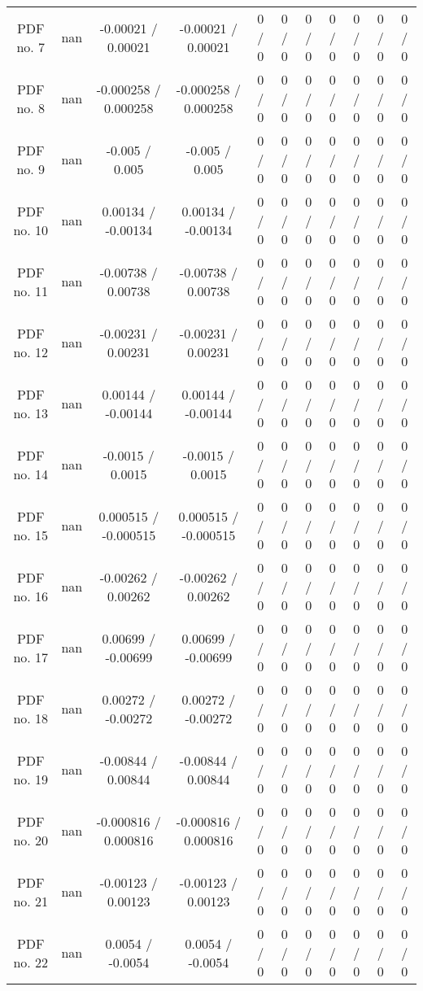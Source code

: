 \begin{table}[htbp]
\begin{center}
\begin{tabular}{|c|c|c|c|c|c|c|c|c|c|c|}
  PDF no. 7 &    nan    & -0.00021 / 0.00021 & -0.00021 / 0.00021 & 0 / 0 & 0 / 0 & 0 / 0 & 0 / 0 & 0 / 0 & 0 / 0 & 0 / 0 \\ 
  PDF no. 8 &    nan    & -0.000258 / 0.000258 & -0.000258 / 0.000258 & 0 / 0 & 0 / 0 & 0 / 0 & 0 / 0 & 0 / 0 & 0 / 0 & 0 / 0 \\ 
  PDF no. 9 &    nan    & -0.005 / 0.005 & -0.005 / 0.005 & 0 / 0 & 0 / 0 & 0 / 0 & 0 / 0 & 0 / 0 & 0 / 0 & 0 / 0 \\ 
  PDF no. 10 &    nan    & 0.00134 / -0.00134 & 0.00134 / -0.00134 & 0 / 0 & 0 / 0 & 0 / 0 & 0 / 0 & 0 / 0 & 0 / 0 & 0 / 0 \\ 
  PDF no. 11 &    nan    & -0.00738 / 0.00738 & -0.00738 / 0.00738 & 0 / 0 & 0 / 0 & 0 / 0 & 0 / 0 & 0 / 0 & 0 / 0 & 0 / 0 \\ 
  PDF no. 12 &    nan    & -0.00231 / 0.00231 & -0.00231 / 0.00231 & 0 / 0 & 0 / 0 & 0 / 0 & 0 / 0 & 0 / 0 & 0 / 0 & 0 / 0 \\ 
  PDF no. 13 &    nan    & 0.00144 / -0.00144 & 0.00144 / -0.00144 & 0 / 0 & 0 / 0 & 0 / 0 & 0 / 0 & 0 / 0 & 0 / 0 & 0 / 0 \\ 
  PDF no. 14 &    nan    & -0.0015 / 0.0015 & -0.0015 / 0.0015 & 0 / 0 & 0 / 0 & 0 / 0 & 0 / 0 & 0 / 0 & 0 / 0 & 0 / 0 \\ 
  PDF no. 15 &    nan    & 0.000515 / -0.000515 & 0.000515 / -0.000515 & 0 / 0 & 0 / 0 & 0 / 0 & 0 / 0 & 0 / 0 & 0 / 0 & 0 / 0 \\ 
  PDF no. 16 &    nan    & -0.00262 / 0.00262 & -0.00262 / 0.00262 & 0 / 0 & 0 / 0 & 0 / 0 & 0 / 0 & 0 / 0 & 0 / 0 & 0 / 0 \\ 
  PDF no. 17 &    nan    & 0.00699 / -0.00699 & 0.00699 / -0.00699 & 0 / 0 & 0 / 0 & 0 / 0 & 0 / 0 & 0 / 0 & 0 / 0 & 0 / 0 \\ 
  PDF no. 18 &    nan    & 0.00272 / -0.00272 & 0.00272 / -0.00272 & 0 / 0 & 0 / 0 & 0 / 0 & 0 / 0 & 0 / 0 & 0 / 0 & 0 / 0 \\ 
  PDF no. 19 &    nan    & -0.00844 / 0.00844 & -0.00844 / 0.00844 & 0 / 0 & 0 / 0 & 0 / 0 & 0 / 0 & 0 / 0 & 0 / 0 & 0 / 0 \\ 
  PDF no. 20 &    nan    & -0.000816 / 0.000816 & -0.000816 / 0.000816 & 0 / 0 & 0 / 0 & 0 / 0 & 0 / 0 & 0 / 0 & 0 / 0 & 0 / 0 \\ 
  PDF no. 21 &    nan    & -0.00123 / 0.00123 & -0.00123 / 0.00123 & 0 / 0 & 0 / 0 & 0 / 0 & 0 / 0 & 0 / 0 & 0 / 0 & 0 / 0 \\ 
  PDF no. 22 &    nan    & 0.0054 / -0.0054 & 0.0054 / -0.0054 & 0 / 0 & 0 / 0 & 0 / 0 & 0 / 0 & 0 / 0 & 0 / 0 & 0 / 0 \\ 

\end{tabular}
\end{center}
\end{table}
